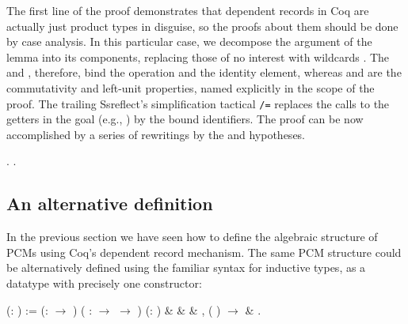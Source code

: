 The first line of the proof demonstrates that dependent records in Coq
are actually just product types in disguise, so the proofs about them
should be done by case analysis. In this particular case, we decompose
the  argument of the lemma into its components, replacing those
of no interest with wildcards \coqdocvar{\_}. The  and , therefore,
bind the operation and the identity element, whereas  and 
are the commutativity and left-unit properties, named explicitly in
the scope of the proof. The trailing Ssreflect's simplification
tactical \texttt{/=}\ssrtl{/=} replaces the calls to the getters in
the goal (e.g.,  ) by the bound identifiers. The proof can
be now accomplished by a series of rewritings by the  and 
hypotheses.


\begin{coqdoccode}
\coqdocemptyline
\coqdocnoindent
{}   .\coqdoceol
\coqdocnoindent
{}.\coqdoceol
\coqdocemptyline
\end{coqdoccode}


\subsection{An alternative definition}




In the previous section we have seen how to define the algebraic
structure of PCMs using Coq's dependent record mechanism. The same PCM
structure could be alternatively defined using the familiar syntax for
inductive types, as a datatype with precisely one constructor:


\begin{coqdoccode}
\coqdocemptyline
\coqdocnoindent
{}  (: ) := \coqdoceol
\coqdocindent{1.00em}
 (:  \ensuremath{\rightarrow} ) ( :  \ensuremath{\rightarrow}  \ensuremath{\rightarrow} ) (: ) \coqdoceol
\coqdocindent{2.00em}
  \&\coqdoceol
\coqdocindent{2.00em}
  \&\coqdoceol
\coqdocindent{2.00em}
   \&\coqdoceol
\coqdocindent{2.00em}
\coqdockw{\ensuremath{\forall}}  ,  (  ) \ensuremath{\rightarrow}   \&\coqdoceol
\coqdocindent{2.00em}
 .\coqdoceol
\coqdocemptyline
\end{coqdoccode}



